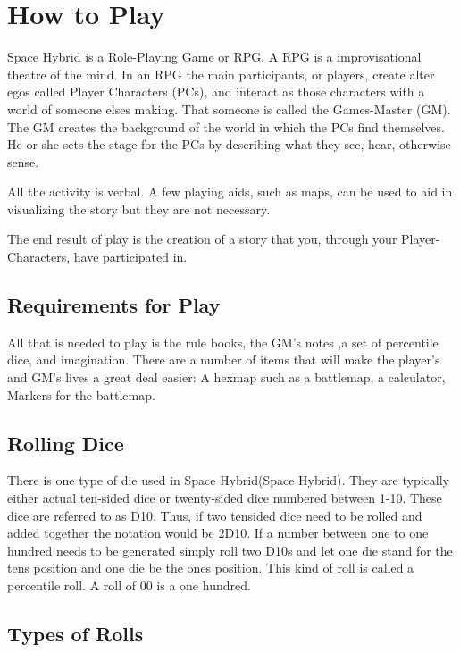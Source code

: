 \chapter{How to Play}

Space Hybrid is a Role-Playing Game or RPG. A RPG is a improvisational theatre 
of the mind. In an RPG the main participants, or players, create alter egos called
Player Characters (PCs), and interact as those characters with a world of someone
elses making. That someone is called the Games-Master (GM). The GM creates the 
background of the world in which the PCs find themselves. He or she sets 
the stage for the PCs by describing what they see, hear, otherwise sense. 

All the activity is verbal. A few playing aids, such as maps, can be used 
to aid in visualizing the story but they are not necessary. 

The end result of play is the creation of a story that you, through
your Player-Characters, have participated in. 

\section{Requirements for Play}

All that is needed to play is the rule books, the GM's notes 
,a set of percentile dice, and imagination. There are a number of items that 
will make the player's and GM's lives a great deal easier: 
A hexmap such as a battlemap, a calculator, Markers for the battlemap.

\section{Rolling Dice}

There is one type of die used in Space Hybrid(Space Hybrid). They are
typically either actual ten-sided dice or twenty-sided dice 
numbered between 1-10. These dice are referred to as D10. Thus,
if two tensided dice need to be rolled and added together the 
notation would be 2D10. If a number between one to one hundred needs
to be generated simply roll two D10s and let one die stand for the 
tens position and one die be the ones position. This kind of roll is 
called a percentile roll. A roll of 00 is a one hundred. 

\section{Types of Rolls}


